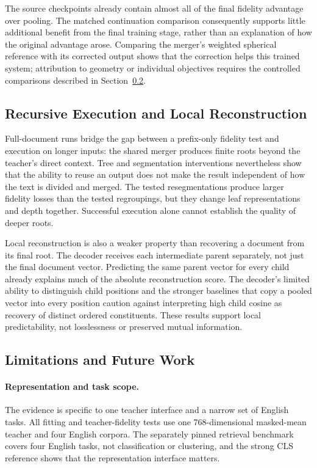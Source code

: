 \documentclass[10pt]{article}
\begin{document}
The source checkpoints already contain almost all of the final fidelity
advantage over pooling. The matched continuation comparison consequently
supports little additional benefit from the final training stage, rather than
an explanation of how the original advantage arose. Comparing the merger's weighted spherical reference with its corrected output
shows that the correction helps this trained system;
attribution to geometry or individual objectives requires the controlled
comparisons described in Section~\ref{sec:limitations}.

\subsection{Recursive Execution and Local Reconstruction}

Full-document runs bridge the gap between a prefix-only fidelity test and
execution on longer inputs: the shared merger produces finite roots beyond
the teacher's direct context. Tree and segmentation interventions nevertheless
show that the ability to reuse an output does not make the result independent
of how the text is divided and merged. The tested resegmentations produce
larger fidelity losses than the tested regroupings, but they change leaf
representations and depth together.
Successful execution alone cannot establish the quality of deeper roots.

Local reconstruction is also a weaker property than recovering a document
from its final root. The decoder receives each intermediate parent separately, not just the final
document vector. Predicting the same parent vector for every child already
explains much of the absolute reconstruction score. The decoder's limited ability to distinguish child positions and the stronger
baselines that copy a pooled vector into every position caution against interpreting
high child cosine as recovery of distinct ordered constituents. These results
support local predictability, not losslessness or preserved mutual information.

\subsection{Limitations and Future Work}
\label{sec:limitations}

\paragraph{Representation and task scope.}
The evidence is specific to one teacher interface and a narrow set of English tasks.
All fitting and teacher-fidelity tests use one 768-dimensional masked-mean
teacher and four English corpora. The separately pinned retrieval benchmark
covers four English tasks, not classification or clustering, and the strong
CLS reference shows that the representation interface matters.
\end{document}
